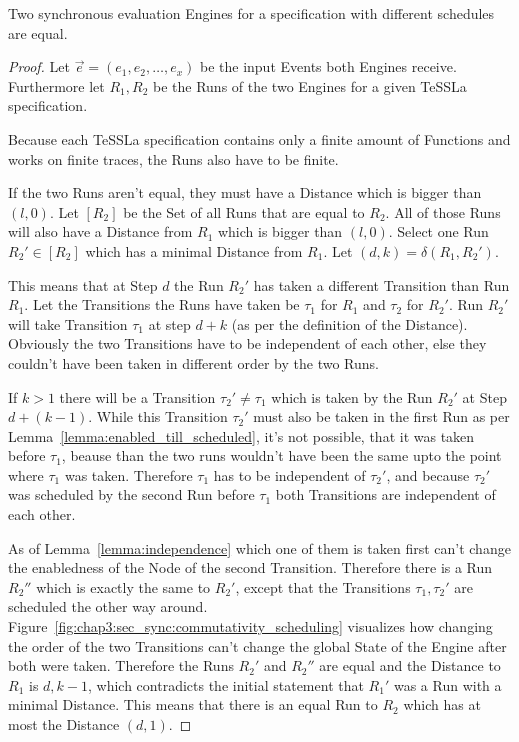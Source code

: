 \begin{theorem}[name = Equality of different synchronous evaluation Engines]\label{theorem:equal_sync_eval_engines}
  Two synchronous evaluation Engines for a specification with different schedules are equal.
\end{theorem}
\begin{proof}

Let \(\vec{e} = (e_1, e_2, \dots, e_x)\) be the input Events both Engines receive.
Furthermore let \(R_1, R_2\) be the Runs of the two Engines for a given TeSSLa specification.

Because each TeSSLa specification contains only a finite amount of Functions and works on finite traces, the Runs also have to be finite.

If the two Runs aren't equal, they must have a Distance which is bigger than \((l, 0)\).
Let \([R_2]\) be the Set of all Runs that are equal to \(R_2\).
All of those Runs will also have a Distance from \(R_1\) which is bigger than \((l, 0)\).
Select one Run \(R_2' \in [R_2]\) which has a minimal Distance from \(R_1\).
Let \((d,k) = \delta(R_1, R_2')\).

This means that at Step \(d\) the Run \(R_2'\) has taken a different Transition than Run \(R_1\).
Let the Transitions the Runs have taken be \(\tau_1\) for \(R_1\) and \(\tau_2\) for \(R_2'\).
Run \(R_2'\) will take Transition \(\tau_1\) at step \(d+k\) (as per the definition of the Distance).
Obviously the two Transitions have to be independent of each other, else they couldn't have been taken in different order by the two Runs.

If \(k > 1\) there will be a Transition \(\tau_2' \neq \tau_1\) which is taken by the Run \(R_2'\) at Step \(d+(k-1)\).
While this Transition \(\tau_2'\) must also be taken in the first Run as per Lemma~\ref{lemma:enabled_till_scheduled}, it's not possible, that it was taken before \(\tau_1\), beause than the two runs wouldn't have been the same upto the point where \(\tau_1\) was taken.
Therefore \(\tau_1\) has to be independent of \(\tau_2'\), and because \(\tau_2'\) was scheduled by the second Run before \(\tau_1\) both Transitions are independent of each other.

As of Lemma~\ref{lemma:independence} which one of them is taken first can't change the enabledness of the Node of the second Transition.
Therefore there is a Run \(R_2''\) which is exactly the same to \(R_2'\), except that the Transitions \(\tau_1, \tau_2'\) are scheduled the other way around.
Figure~\ref{fig:chap3:sec_sync:commutativity_scheduling} visualizes how changing the order of the two Transitions can't change the global State of the Engine after both were taken.
Therefore the Runs \(R_2'\) and \(R_2''\) are equal and the Distance to \(R_1\) is \(d, k-1\), which contradicts the initial statement that \(R_1'\) was a Run with a minimal Distance.
This means that there is an equal Run to \(R_2\) which has at most the Distance \((d, 1)\).


\end{proof}
